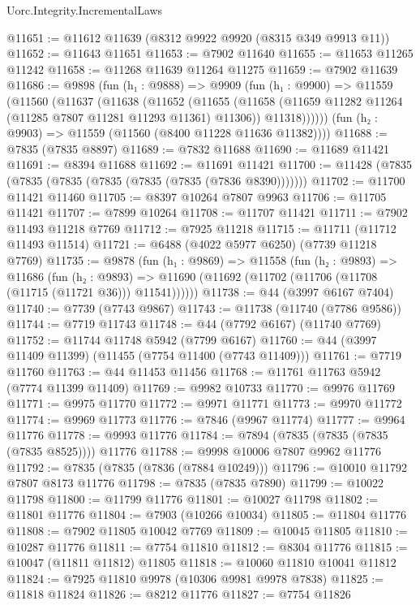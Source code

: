 \begin{lexlean}{Uorc.Integrity.IncrementalLaws}
\begin{coremodule}
@11651 := @11612 @11639 (@8312 @9922 @9920 (@8315 @349 @9913 @11))
@11652 := @11643 @11651
@11653 := @7902 @11640
@11655 := @11653 @11265 @11242
@11658 := @11268 @11639 @11264 @11275
@11659 := @7902 @11639
@11686 := @9898
    (fun (h₁ : @9888) =>
    @9909
      (fun (h₁ : @9900) =>
      @11559
        (@11560
          (@11637
            (@11638
              (@11652
                (@11655
                  (@11658 (@11659 @11282 @11264 (@11285 @7807 @11281 @11293 @11361) @11306))
                  @11318))))))
      (fun (h₂ : @9903) => @11559 (@11560 (@8400 @11228 @11636 @11382))))
@11688 := @7835 (@7835 @8897)
@11689 := @7832 @11688
@11690 := @11689 @11421
@11691 := @8394 @11688
@11692 := @11691 @11421
@11700 := @11428 (@7835 (@7835 (@7835 (@7835 (@7835 (@7835 (@7836 @8390)))))))
@11702 := @11700 @11421 @11460
@11705 := @8397 @10264 @7807 @9963
@11706 := @11705 @11421
@11707 := @7899 @10264
@11708 := @11707 @11421
@11711 := @7902 @11493 @11218 @7769
@11712 := @7925 @11218
@11715 := @11711 (@11712 @11493 @11514)
@11721 := @6488 (@4022 @5977 @6250) (@7739 @11218 @7769)
@11735 := @9878
    (fun (h₁ : @9869) =>
    @11558
      (fun (h₂ : @9893) =>
      @11686
        (fun (h₂ : @9893) =>
        @11690 (@11692 (@11702 (@11706 (@11708 (@11715 (@11721 @36))) @11541))))))
@11738 := @44 (@3997 @6167 @7404)
@11740 := @7739 (@7743 @9867)
@11743 := @11738 (@11740 (@7786 @9586))
@11744 := @7719 @11743
@11748 := @44 (@7792 @6167) (@11740 @7769)
@11752 := @11744 @11748 @5942 (@7799 @6167)
@11760 := @44 (@3997 @11409 @11399) (@11455 (@7754 @11400 (@7743 @11409)))
@11761 := @7719 @11760
@11763 := @44 @11453 @11456
@11768 := @11761 @11763 @5942 (@7774 @11399 @11409)
@11769 := @9982 @10733
@11770 := @9976 @11769
@11771 := @9975 @11770
@11772 := @9971 @11771
@11773 := @9970 @11772
@11774 := @9969 @11773
@11776 := @7846 (@9967 @11774)
@11777 := @9964 @11776
@11778 := @9993 @11776
@11784 := @7894 (@7835 (@7835 (@7835 (@7835 @8525)))) @11776
@11788 := @9998 @10006 @7807 @9962 @11776
@11792 := @7835 (@7835 (@7836 (@7884 @10249)))
@11796 := @10010 @11792 @7807 @8173 @11776
@11798 := @7835 (@7835 @7890)
@11799 := @10022 @11798
@11800 := @11799 @11776
@11801 := @10027 @11798
@11802 := @11801 @11776
@11804 := @7903 (@10266 @10034)
@11805 := @11804 @11776
@11808 := @7902 @11805 @10042 @7769
@11809 := @10045 @11805
@11810 := @10287 @11776
@11811 := @7754 @11810
@11812 := @8304 @11776
@11815 := @10047 (@11811 @11812) @11805
@11818 := @10060 @11810 @10041 @11812
@11824 := @7925 @11810 @9978 (@10306 @9981 @9978 @7838)
@11825 := @11818 @11824
@11826 := @8212 @11776
@11827 := @7754 @11826

\end{coremodule}
\end{lexlean}
